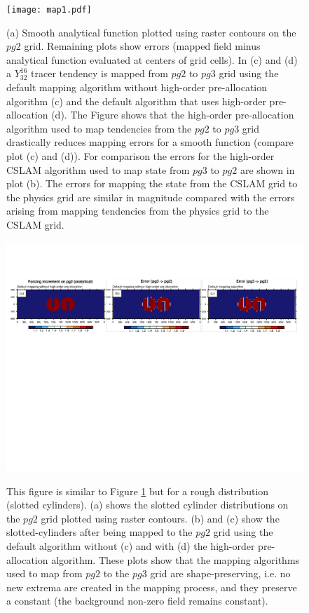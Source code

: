 \documentclass[draft,linenumbers]{agujournal}
\begin{document}
\begin{figure}[t]
\begin{center}
\noindent\texttt{[image: map1.pdf]}\\
\end{center}
\caption{(a) Smooth analytical function \citep[approximate spherical harmonic of order 32 and azimuthal wave number 16 referred to as $Y^{16}_{32}$; ][]{J1999MWR} plotted using raster contours on the $pg2$ grid. Remaining plots show errors (mapped field minus analytical function evaluated at centers of grid cells). In (c) and (d) a $Y^{16}_{32}$ tracer tendency is mapped from $pg2$ to $pg3$ grid using the default mapping algorithm without high-order pre-allocation algorithm (c) and the default algorithm that uses high-order pre-allocation (d). The Figure shows that the high-order pre-allocation algorithm used to map tendencies from the $pg2$ to $pg3$ grid drastically reduces mapping errors for a smooth function (compare plot (c) and (d)). For comparison the errors for the high-order CSLAM algorithm used to map state from $pg3$ to $pg2$ are shown in plot (b). The errors for mapping the state from the CSLAM grid to the physics grid are similar in magnitude compared with the errors arising from mapping tendencies from the physics grid to the CSLAM grid.}
\label{fig:mapping1}
\end{figure}

\begin{figure}[t]
\begin{center}
\noindent\includegraphics[width=30pc,angle=0]{map2.pdf}\\
\end{center}
\caption{This figure is similar to Figure \ref{fig:mapping1} but for a rough distribution (slotted cylinders). (a) shows the slotted cylinder distributions on the $pg2$ grid plotted using raster contours. (b) and (c) show the slotted-cylinders after being mapped to the $pg2$ grid using the default algorithm without (c) and with (d) the high-order pre-allocation algorithm. These plots show that the mapping algorithms used to map from $pg2$ to the $pg3$ grid are shape-preserving, i.e. no new extrema are created in the mapping process, and they preserve a constant (the background non-zero field remains constant).}
\label{fig:mapping2}
\end{figure}
\end{document}
